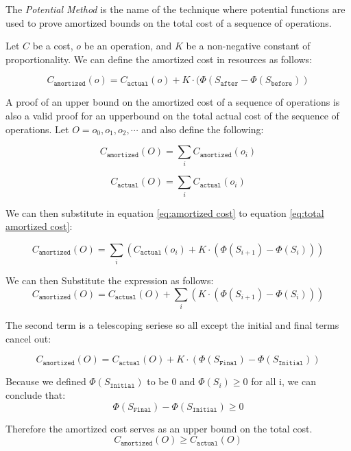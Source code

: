 \documentclass[12pt, letterpaper]{book}
\begin{document}
The \textit{Potential Method} is the name of the technique where potential functions are used to prove amortized bounds on the total cost of a sequence of operations.

Let $C$ be a cost, $o$ be an operation, and $K$ be a non-negative constant of proportionality. We can define the amortized cost in resources as follows:

\begin{equation} \label{eq:amortized cost}
C_{\texttt{amortized}}(o) = C_{\texttt{actual}}(o) + K \cdot (\Phi(S_{\texttt{after}} - \Phi(S_{\texttt{before}})) 
\end{equation}

A proof of an upper bound on the amortized cost of a sequence of operations is also a valid proof for an upperbound on the total actual cost of the sequence of operations. Let $O = o_{0},  o_{1}, o_{2}, \cdots$ and also define the following:

\begin{equation} \label{eq:total amortized cost}
C_{\texttt{amortized}}(O) = \sum_{i}{C_{\texttt{amortized}}(o_{i})}
\end{equation}

\begin{equation} \label{eq:total actual cost}
C_{\texttt{actual}}(O) = \sum_{i}{C_{\texttt{actual}}(o_{i})}
\end{equation}

We can then substitute in equation \ref{eq:amortized cost} to equation \ref{eq:total amortized cost}:

$$C_{\texttt{amortized}}(O) = \sum_{i}{\left(C_{\texttt{actual}}(o_{i}) +  K \cdot (\Phi(S_{i+1}) - \Phi(S_{i})) \right)}$$

We can then Substitute the expression as follows:
$$C_{\texttt{amortized}}(O) = C_{\texttt{actual}}(O) + \sum_{i}{\left(K \cdot (\Phi(S_{i+1}) - \Phi(S_{i})) \right)}$$

The second term is a telescoping seriese so all except the initial and final terms cancel out:

$$C_{\texttt{amortized}}(O) = C_{\texttt{actual}}(O) + K \cdot \left( \Phi(S_{\texttt{Final}}) - \Phi(S_{\texttt{Initial}}) \right)$$

Because we defined $\Phi(S_{\texttt{Initial}})$ to be 0 and $\Phi(S_{i}) \ge 0$ for all i, we can conclude that:
$$\Phi(S_{\texttt{Final}}) - \Phi(S_{\texttt{Initial}}) \ge 0$$

Therefore the amortized cost serves as an upper bound on the total cost.
$$C_{\texttt{amortized}}(O) \ge C_{\texttt{actual}}(O)$$
\end{document}
